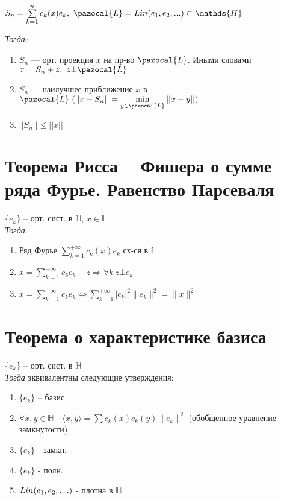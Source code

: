 \documentclass[paper=a4, fontsize=17pt]{article}
\begin{document}
$S_n = \sum\limits_{k=1}^{n} c_k(x)e_k,\ \pazocal{L} = Lin(e_1, e_2, ...) \subset \mathds{H}$

\emph{Тогда:}

\begin{enumerate}

	\item $S_n$ {{---}} орт. проекция $x$ на пр-во $\pazocal{L}$. Иными словами $x = S_n + z,\ z \bot \pazocal{L}$
	
	\item $S_n$ {{---}} наилучшее приближение $x$ в $\pazocal{L}\ (||x - S_n|| = \min\limits_{y \in \pazocal{L}} ||x - y||)$	

	\item $||S_n|| \leqslant ||x||$

\end{enumerate}

\section{Теорема Рисса -- Фишера о сумме ряда Фурье. Равенство Парсеваля}
$\{e_k\}$ -- орт. сист. в $\mathds{H}$, $x \in \mathds{H}$\\

\emph{Тогда}:
\begin{enumerate}
	\item Ряд Фурье $\sum\limits_{k=1}^{+\infty} c_k(x) e_k$ сх-ся в $\mathds{H}$
	\item $x =\sum\limits_{k=1}^{+\infty} c_k e_k + z \Rightarrow \forall k \ z \bot e_k$
	\item $x =\sum\limits_{k=1}^{+\infty} c_k e_k \Leftrightarrow \sum\limits_{k=1}^{+\infty} \vert c_k \vert^2 \|e_k\|^2=\|x\|^2$
\end{enumerate}

\section{Теорема о характеристике базиса}

$\{e_k\}$ -- орт. сист. в $\mathds{H}$\\

\emph{Тогда} эквивалентны следующие утверждения:
\begin{enumerate}
	\item $\{e_k\}$ -- базис
	\item $\forall x, y \in \mathds{H} \quad \langle x, y \rangle = \sum c_k(x)\overline{c_k(y)}\|e_k\|^2$ (обобщенное уравнение замкнутости)
	\item $\{e_k\}$ - замкн.
	\item $\{e_k\}$ - полн.
	\item $Lin(e_1, e_2, \mathellipsis)$ - плотна в $\mathds{H}$ 
\end{enumerate}
\end{document}

